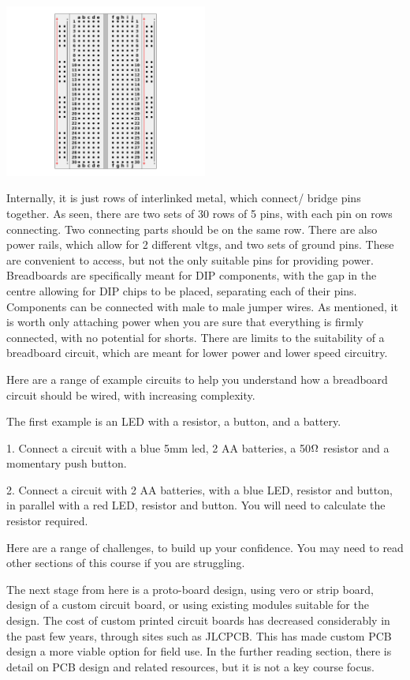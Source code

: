 \documentclass[a4paper,11pt]{report}
\newcommand{\Examples}[1] %
{
\par\noindent %
\phantomsection %
\todo[inline, color=red!30]{\textbf{#1}} %
\vspace{1em} %
}
\newcommand{\Quiz}[1] %
{
\par\noindent %
\phantomsection %
\todo[inline, color=blue!30]{\textbf{#1}} %
\vspace{1em} %
}
\begin{document}
\includegraphics[width=0.5\textwidth]{breadboard}

Internally, it is just rows of interlinked metal, which connect/ bridge pins together. As seen, there are two sets of 30 rows of 5 pins, with each pin on rows connecting. Two connecting parts should be on the same row. There are also power rails, which allow for 2 different \gls{vltg}s, and two sets of ground pins. These are convenient to access, but not the only suitable pins for providing power. Breadboards are specifically meant for DIP components, with the gap in the centre allowing for DIP chips to be placed, separating each of their pins. Components can be connected with male to male jumper wires. As mentioned, it is worth only attaching power when you are sure that everything is firmly connected, with no potential for shorts. There are limits to the suitability of a breadboard circuit, which are meant for lower power and lower speed circuitry.

\Examples{Examples}

Here are a range of example circuits to help you understand how a breadboard circuit should be wired, with increasing complexity.

The first example is an LED with a resistor, a button, and a battery.

\Quiz{Challenges}

1. Connect a circuit with a blue 5mm led, 2 AA batteries, a 50$\ohm$ resistor and a momentary push button.

2. Connect a circuit with 2 AA batteries, with a blue LED, resistor and button, in parallel with a red LED, resistor and button. You will need to calculate the resistor required.

Here are a range of challenges, to build up your confidence. You may need to read other sections of this course if you are struggling.

The next stage from here is a proto-board design, using vero or strip board, design of a custom circuit board, or using existing modules suitable for the design. The cost of custom printed circuit boards has decreased considerably in the past few years, through sites such as JLCPCB. This has made custom PCB design a more viable option for field use.
In the further reading section, there is detail on PCB design and related resources, but it is not a key course focus.
\end{document}
